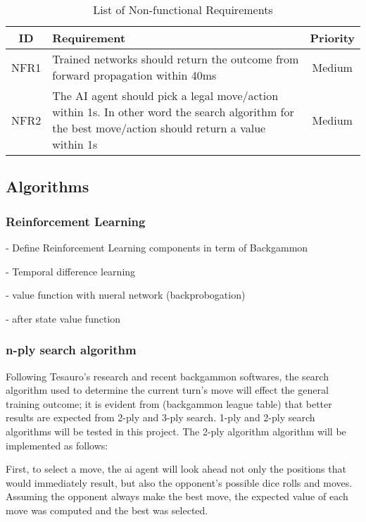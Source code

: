 \documentclass[12pt,a4paper]{article}
\begin{document}
\begin{table}[htb]
    \centering
    \caption{List of Non-functional Requirements}
    \vspace*{6pt}
    \label{nonreq}
    \begin{tabular}{cp{12cm}c}
        \hline
        \hline
        ID & Requirement & Priority \\ 
        \hline
        NFR1 & Trained networks should return the outcome from forward propagation within 40ms & Medium \\
        \hline
        NFR2 & The AI agent should pick a legal move/action within 1s. In other word the search algorithm for the best move/action should return a value within 1s & Medium \\
        \hline
    \end{tabular}
\end{table}
\subsection{Algorithms}
\subsubsection{Reinforcement Learning}
- Define Reinforcement Learning components in term of Backgammon

- Temporal difference learning

- value function with nueral network (backprobogation)

- after state value function

\subsubsection{n-ply search algorithm}
Following Tesauro's research and recent backgammon softwares, the search algorithm used to determine the current turn's move will effect the general training outcome; it is evident from (backgammon league table) that better results are expected from 2-ply and 3-ply search. 1-ply and 2-ply search algorithms will be tested in this project. The 2-ply algorithm algorithm will be implemented as follows:

First, to select a move, the ai agent will look ahead not only the positions that would immediately result, but also the opponent's possible dice rolls and moves. Assuming the opponent always make the best move, the expected value of each move was computed and the best was selected. 
\end{document}

